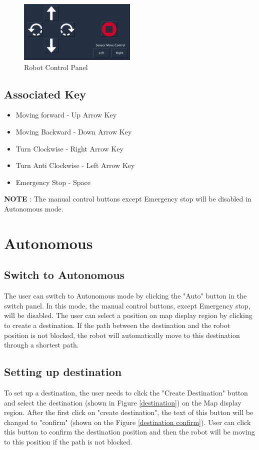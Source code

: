 \documentclass[12pt,a4paper]{article}
\begin{document}
\begin{figure}[!htb]
\centering
\includegraphics[width=0.5\textwidth]{RobotControlPanel.png}
\caption{Robot Control Panel}
\end{figure}

\subsection{Associated Key} 
\begin{itemize}
\item Moving forward -				Up Arrow Key
\item Moving Backward -   	Down Arrow Key
\item Turn Clockwise   -  		 Right Arrow Key
\item Turn Anti Clockwise -   	 Left Arrow Key
\item Emergency Stop -        Space
\end{itemize}

\textbf{NOTE} : The manual control buttons except Emergency stop will be disabled in Autonomous mode.

\newpage

\section{Autonomous}
\subsection{Switch to Autonomous} 
The user can switch to Autonomous mode by clicking the "Auto" button in the switch panel. In this mode, the manual control buttons, except Emergency stop, will be disabled. The user can select a position on map display region by clicking to create a destination. If the path between the destination and the robot position is not blocked, the robot will automatically move to this destination through a shortest path.
\subsection{Setting up destination} 
To set up a destination, the user needs to click the "Create Destination" button and select the destination (shown in Figure \ref{destination}) on the Map display region. After the first click on "create destination", the text of this button will be changed to "confirm" (shown on the Figure \ref{destination confirm}). User can click this button to confirm the destination position and then the robot will be moving to this position if the path is not blocked.
\end{document}
